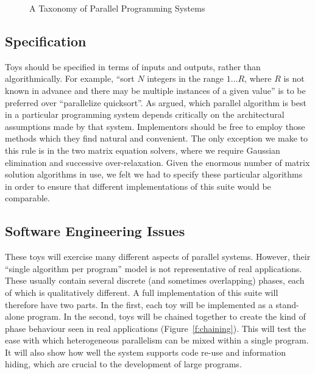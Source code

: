\begin{figure}
\caption{A Taxonomy of Parallel Programming Systems\label{f:taxonomy}}
\end{figure}

\subsection{Specification\label{s:method-spec}}

Toys should be specified in terms of inputs and outputs,
rather than algorithmically.
For example,
``sort $N$ integers in the range $1{\ldots}R$,
where $R$ is not known in advance and there may be multiple instances of a given value''
is to be preferred over
``parallelize quicksort''.
As \cite{b:slalom} argued,
which parallel algorithm is best in a particular programming system
depends critically on the architectural assumptions made by that system.
Implementors should be free to employ those methods which they find natural and convenient.
The only exception we make to this rule is in the two matrix equation solvers,
where we require Gaussian elimination and successive over-relaxation.
Given the enormous number of matrix solution algorithms in use,
we felt we had to specify these particular algorithms in order to ensure that
different implementations of this suite would be comparable.

\subsection{Software Engineering Issues\label{s:method-softeng}}

These toys will exercise many different aspects of parallel systems.
However,
their ``single algorithm per program'' model is not representative of real applications.
These usually contain several discrete (and sometimes overlapping) phases,
each of which is qualitatively different.
A full implementation of this suite will therefore have two parts.
In the first,
each toy will be implemented as a stand-alone program.
In the second,
toys will be chained together to create the kind of phase behaviour seen in real applications
(Figure~\ref{f:chaining}).
This will test the ease with which heterogeneous parallelism can be mixed within a single program.
It will also show how well the system supports code re-use and information hiding,
which are crucial to the development of large programs.

